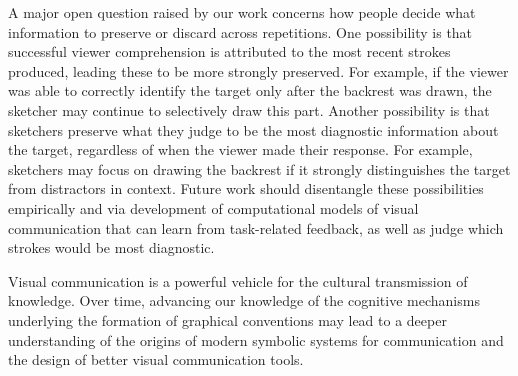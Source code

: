 \documentclass[11pt,letterpaper]{article}
\begin{document}

A major open question raised by our work concerns how people decide what information to preserve or discard across repetitions.
One possibility is that successful viewer comprehension is attributed to the most recent strokes produced, leading these to be more strongly preserved.
For example, if the viewer was able to correctly identify the target only after the backrest was drawn, the sketcher may continue to selectively draw this part.
Another possibility is that sketchers preserve what they judge to be the most diagnostic information about the target, regardless of when the viewer made their response.
For example, sketchers may focus on drawing the backrest if it strongly distinguishes the target from distractors in context.
Future work should disentangle these possibilities empirically and via development of computational models of visual communication that can learn from task-related feedback, as well as judge which strokes would be most diagnostic.

Visual communication is a powerful vehicle for the cultural transmission of knowledge.
Over time, advancing our knowledge of the cognitive mechanisms underlying the formation of graphical conventions may lead to a deeper understanding of the origins of modern symbolic systems for communication and the design of better visual communication tools.
\end{document}
